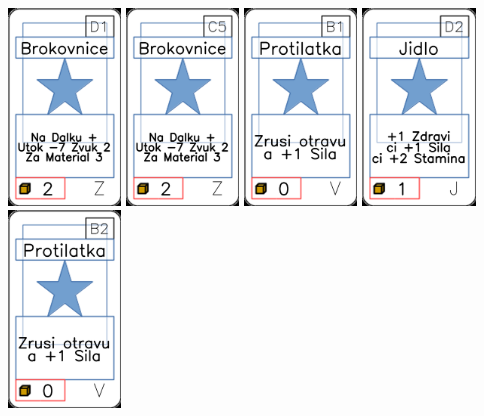 \documentclass[a4paper]{article}
\begin{document}
	\includegraphics[width=3.0cm]{img-1_105}
	\includegraphics[width=3.0cm]{img-1_104}
	\includegraphics[width=3.0cm]{img-1_65}
	\includegraphics[width=3.0cm]{img-1_16}
	\includegraphics[width=3.0cm]{img-1_66}
\end{document}
